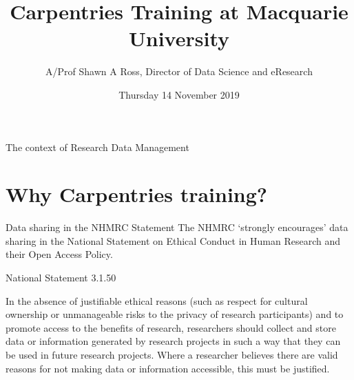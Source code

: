 \documentclass[aspectratio=169, 11pt]{beamer} %
\title{Carpentries Training at Macquarie University} %
\author{A/Prof Shawn A Ross, Director of Data Science and eResearch}               %
\institute{Office of the Deputy Vice-Chancellor (Research)}         %
\date{Thursday 14 November 2019} %
\begin{document}

\maketitle

  

\begin{frame}{The context of Research Data Management}
  \tableofcontents
\end{frame}

%



\section{Why Carpentries training?}

\begin{frame}{Data sharing in the NHMRC Statement}
    The NHMRC `strongly encourages' data sharing in the National Statement on Ethical Conduct in Human Research and their Open Access Policy. \cite{Nhmrc2018-sj, Nhmrc2018-vn} \par
    National Statement 3.1.50 \par
    In the absence of justifiable ethical reasons (such as respect for cultural ownership or unmanageable risks to the privacy of research participants) and to promote access to the benefits of research, researchers should collect and store data or information generated by research projects in such a way that they can be used in future research projects. Where a researcher believes there are valid reasons for not making data or information accessible, this must be justified.
\end{frame}
\end{document}
